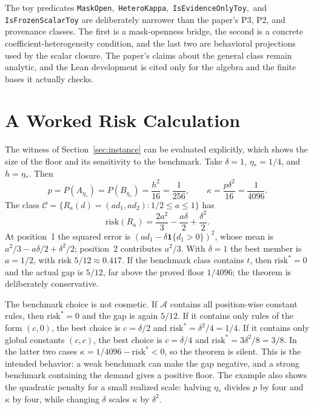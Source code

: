 \documentclass[twoside,11pt]{article}
\begin{document}
The toy predicates \texttt{MaskOpen},\allowbreak\ \texttt{Hetero}\allowbreak\texttt{Kappa},\allowbreak\ \texttt{IsEvidence}\allowbreak\texttt{OnlyToy},\allowbreak\ and \texttt{IsFrozen}\allowbreak\texttt{ScalarToy} are deliberately narrower than the paper's P3, P2, and provenance classes. The first is a mask-openness bridge, the second is a concrete coefficient-heterogeneity condition, and the last two are behavioral projections used by the scalar closure. The paper's claims about the general class remain analytic, and the Lean development is cited only for the algebra and the finite bases it actually checks.

\section{A Worked Risk Calculation}
\label{app:calculation}

The witness of Section~\ref{sec:instance} can be evaluated explicitly, which shows the size of the floor and its sensitivity to the benchmark. Take $\delta=1$, $\eta_*=1/4$, and $h=\eta_*$. Then
\[
p=P(A_{\eta_*})=P(B_{\eta_*})=\frac{h^2}{16}=\frac{1}{256},
\qquad
\kappa=\frac{p\delta^2}{16}=\frac{1}{4096}.
\]
The class $\mathcal{C}=\{R_a(d)=(a d_1,a d_2):1/2\le a\le1\}$ has
\[
\mathrm{risk}(R_a)=\frac{2a^2}{3}-\frac{a\delta}{2}+\frac{\delta^2}{2}.
\]
At position~1 the squared error is $(a d_1-\delta\mathbf{1}\{d_1>0\})^2$, whose mean is $a^2/3-a\delta/2+\delta^2/2$; position~2 contributes $a^2/3$. With $\delta=1$ the best member is $a=1/2$, with risk $5/12\approx0.417$. If the benchmark class contains $t$, then $\mathrm{risk}^*=0$ and the actual gap is $5/12$, far above the proved floor $1/4096$; the theorem is deliberately conservative.

The benchmark choice is not cosmetic. If $\mathcal{A}$ contains all position-wise constant rules, then $\mathrm{risk}^*=0$ and the gap is again $5/12$. If it contains only rules of the form $(c,0)$, the best choice is $c=\delta/2$ and $\mathrm{risk}^*=\delta^2/4=1/4$. If it contains only global constants $(c,c)$, the best choice is $c=\delta/4$ and $\mathrm{risk}^*=3\delta^2/8=3/8$. In the latter two cases $\kappa=1/4096-\mathrm{risk}^*<0$, so the theorem is silent. This is the intended behavior: a weak benchmark can make the gap negative, and a strong benchmark containing the demand gives a positive floor. The example also shows the quadratic penalty for a small realized scale: halving $\eta_*$ divides $p$ by four and $\kappa$ by four, while changing $\delta$ scales $\kappa$ by $\delta^2$.
\end{document}
